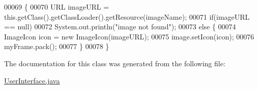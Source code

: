 \begin{DoxyCode}
00069                                             \{
00070         URL imageURL = this.getClass().getClassLoader().getResource(imageName);
00071         \textcolor{keywordflow}{if}(imageURL == null)
00072             System.out.println(\textcolor{stringliteral}{"image not found"});
00073         \textcolor{keywordflow}{else} \{
00074             ImageIcon icon = \textcolor{keyword}{new} ImageIcon(imageURL);
00075             image.setIcon(icon);
00076             myFrame.pack();
00077         \}
00078     \}
\end{DoxyCode}


The documentation for this class was generated from the following file\-:\begin{DoxyCompactItemize}
\item 
\hyperlink{UserInterface_8java}{User\-Interface.\-java}\end{DoxyCompactItemize}
